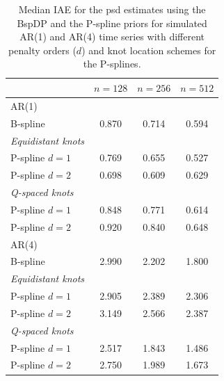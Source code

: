 \documentclass[twocolumn,final]{svjour3}
\begin{document}
\def\arraystretch{1.1}
\begin{table}
	\centering
		\begin{tabular}{lccc}
			\toprule
			& $n=128$ & $n=256$ & $n=512$ \\ \hline
			AR(1)     &  &  &  \\ 
			B-spline &  0.870 & 0.714 & 0.594  \\
			\textit{Equidistant knots}& & &   \\
			\hspace{0.5em}P-spline $d=1$ &  0.769 & 0.655 & 0.527 \\
			\hspace{0.5em}P-spline $d=2$&  0.698 & 0.609 & 0.629 \\
			\textit{Q-spaced knots}& & &   \\
			\hspace{0.5em}P-spline $d=1$ & 0.848 & 0.771 & 0.614 \\
			\hspace{0.5em}P-spline $d=2$ & 0.920 & 0.840 & 0.648 \\ \hline
			AR(4)     &  &  &  \\ 
			B-spline & 2.990 & 2.202 & 1.800   \\
			\textit{Equidistant knots}& & &   \\
			\hspace{0.5em}P-spline $d=1$ &  2.905 & 2.389 & 2.306\\
			\hspace{0.5em}P-spline $d=2$&  3.149 & 2.566 & 2.387\\
			\textit{Q-spaced knots}& & &   \\
			\hspace{0.5em}P-spline $d=1$ & 2.517 & 1.843 & 1.486\\
			\hspace{0.5em}P-spline $d=2$ &  2.750 & 1.989 & 1.673\\
			\bottomrule
		\end{tabular}
	\caption{Median IAE for the psd estimates using the BspDP and the P-spline priors for simulated AR(1) and AR(4) time series with  different penalty orders ($d$) and knot location schemes for the P-splines.}
	\label{table:sim_IAE}
\end{table}
\end{document}
